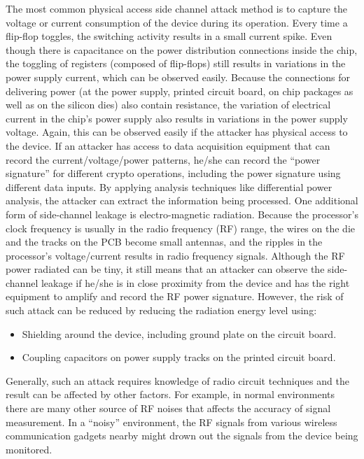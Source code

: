 \documentclass[
  a4paper,
]{report}
\providecommand{\tightlist}{%
  \setlength{\itemsep}{0pt}\setlength{\parskip}{0pt}}
\begin{document}
The most common physical access side channel attack method is to capture
the voltage or current consumption of the device during its operation.
Every time a flip-flop toggles, the switching activity results in a
small current spike. Even though there is capacitance on the power
distribution connections inside the chip, the toggling of registers
(composed of flip-flops) still results in variations in the power supply
current, which can be observed easily. Because the connections for
delivering power (at the power supply, printed circuit board, on chip
packages as well as on the silicon dies) also contain resistance, the
variation of electrical current in the chip's power supply also results
in variations in the power supply voltage. Again, this can be observed
easily if the attacker has physical access to the device. If an attacker
has access to data acquisition equipment that can record the
current/voltage/power patterns, he/she can record the ``power
signature'' for different crypto operations, including the power
signature using different data inputs. By applying analysis techniques
like differential power analysis, the attacker can extract the
information being processed. One additional form of side-channel leakage
is electro-magnetic radiation. Because the processor's clock frequency
is usually in the radio frequency (RF) range, the wires on the die and
the tracks on the PCB become small antennas, and the ripples in the
processor's voltage/current results in radio frequency signals. Although
the RF power radiated can be tiny, it still means that an attacker can
observe the side-channel leakage if he/she is in close proximity from
the device and has the right equipment to amplify and record the RF
power signature. However, the risk of such attack can be reduced by
reducing the radiation energy level using:

\begin{itemize}
\tightlist
\item
  Shielding around the device, including ground plate on the circuit
  board.
\item
  Coupling capacitors on power supply tracks on the printed circuit
  board.
\end{itemize}

Generally, such an attack requires knowledge of radio circuit techniques
and the result can be affected by other factors. For example, in normal
environments there are many other source of RF noises that affects the
accuracy of signal measurement. In a ``noisy'' environment, the RF
signals from various wireless communication gadgets nearby might drown
out the signals from the device being monitored.
\end{document}
